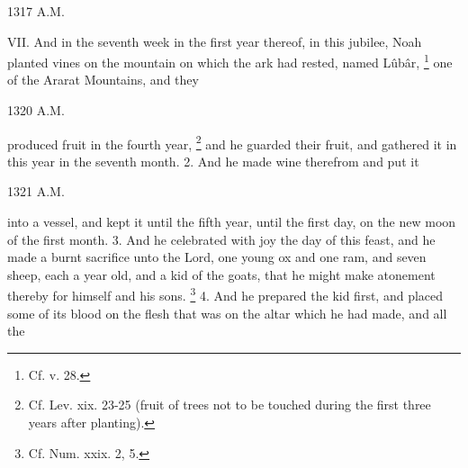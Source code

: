 
1317 A.M.

VII. And in the seventh week in the first year thereof, in this jubilee, Noah planted vines on the mountain on which the ark had rested, named Lûbâr, \footnote{Cf. v. 28.} one of the Ararat Mountains, and they

1320 A.M.

produced fruit in the fourth year, \footnote{Cf. Lev. xix. 23-25 (fruit of trees not to be touched during the first three years after planting).} and he guarded their fruit, and gathered it in this year in the seventh month. 2. And he made wine therefrom and put it

1321 A.M.

into a vessel, and kept it until the fifth year, until the first day, on the new moon of the first month. 3. And he celebrated with joy the day of this feast, and he made a burnt sacrifice unto the Lord, one young ox and one ram, and seven sheep, each a year old, and a kid of the goats, that he might make atonement thereby for himself and his sons. \footnote{Cf. Num. xxix. 2, 5.} 4. And he prepared the kid first, and placed some of its blood on the flesh that was on the altar which he had made, and all the

